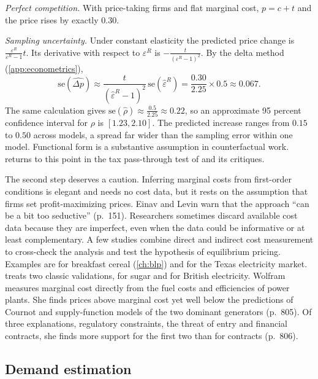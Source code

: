 \begin{example}
\emph{Perfect competition.} With price-taking firms and flat marginal cost, $p = c + t$ and the price rises
by exactly $0.30$.

\emph{Sampling uncertainty.} Under constant elasticity the predicted price change is
$\frac{\varepsilon^R}{\varepsilon^R - 1}t$. Its derivative with respect to $\varepsilon^R$ is
$-\frac{t}{(\varepsilon^R - 1)^2}$. By the delta method (\cref{app:econometrics}),
\[
  \mathrm{se}(\widehat{\Delta p}) \approx \frac{t}{(\hat\varepsilon^R - 1)^2}\,\mathrm{se}(\hat\varepsilon^R)
  = \frac{0.30}{2.25} \times 0.5 \approx 0.067 .
\]
The same calculation gives $\mathrm{se}(\hat\rho) \approx \frac{0.5}{2.25} \approx 0.22$, so an approximate
95 percent confidence interval for $\rho$ is $[1.23, 2.10]$. The predicted increase ranges from $0.15$ to
$0.50$ across models, a spread far wider than the sampling error within one model. Functional form is a
substantive assumption in counterfactual work.  returns to this point in the tax pass-through
test of \citet{Sumner1981} and its critiques.
\end{example}

The second step deserves a caution. Inferring marginal costs from first-order conditions is elegant and needs
no cost data, but it rests on the assumption that firms set profit-maximizing prices. Einav and Levin warn
that the approach ``can be a bit too seductive'' (p.~151). Researchers sometimes discard available cost data
because they are imperfect, even when the data could be informative or at least complementary. A few studies
combine direct and indirect cost measurement to cross-check the analysis and test the hypothesis of
equilibrium pricing. Examples are \citet{Nevo2001} for breakfast cereal (\cref{ch:blp}) and
\citet{HortacsuPuller2008} for the Texas electricity market.  treats two classic
validations, \citet{GenesoveMullin1998} for sugar and \citet{Wolfram1999} for British electricity. Wolfram
measures marginal cost directly from the fuel costs and efficiencies of power plants. She finds prices above
marginal cost yet well below the predictions of Cournot and supply-function models of the two dominant
generators (p.~805). Of three explanations, regulatory constraints, the threat of entry and financial contracts,
she finds more support for the first two than for contracts (p.~806).

\subsection{Demand estimation}\label{sec:01-today-demand}

